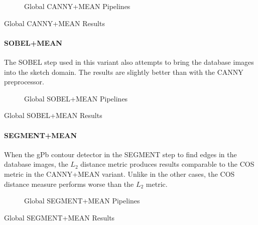 \begin{figure}[h]
    \centering
    
    \caption[Global CANNY+MEAN Pipelines]{
        Global CANNY+MEAN Pipelines
    }
    \label{fig:pipeline_global_luma_canny_mean}
\end{figure}

\begin{table}[h]
    \centering
    
    \caption[Global CANNY+MEAN Results]{
        Global CANNY+MEAN Results
    }
    \label{tab:results_global_luma_canny_mean}
\end{table}

\paragraph{SOBEL+MEAN}

The SOBEL step used in this variant also attempts to bring the database images
into the sketch domain. The results are slightly better than with the CANNY
preprocessor.

\begin{figure}[h]
    \centering
    
    \caption[Global SOBEL+MEAN Pipelines]{
        Global SOBEL+MEAN Pipelines
    }
    \label{fig:pipeline_global_luma_sobel_mean}
\end{figure}

\begin{table}[h]
    \centering
    
    \caption[Global SOBEL+MEAN Results]{
        Global SOBEL+MEAN Results
    }
    \label{tab:results_global_luma_sobel_mean}
\end{table}

\paragraph{SEGMENT+MEAN}

When the gPb contour detector in the SEGMENT step to find edges in the database
images, the $L_2$ distance metric produces results comparable to the COS metric
in the CANNY+MEAN variant. Unlike in the other cases, the COS distance measure
performs worse than the $L_2$ metric.

\begin{figure}[h]
    \centering
    
    \caption[Global SEGMENT+MEAN Pipelines]{
        Global SEGMENT+MEAN Pipelines
    }
    \label{fig:pipeline_global_luma_segment_mean}
\end{figure}

\begin{table}[h]
    \centering
    
    \caption[Global SEGMENT+MEAN Results]{
        Global SEGMENT+MEAN Results
    }
    \label{tab:results_global_luma_segment_mean}
\end{table}

